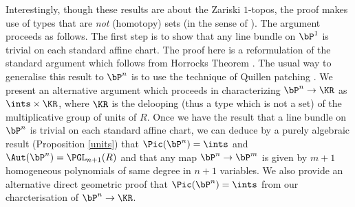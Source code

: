 Interestingly, though these results are
about the Zariski $1$-topos, the proof makes use of types that
are {\em not} (homotopy) sets (in the sense of \cite{hott}).
The argument proceeds as follows. The first step is to show that any line bundle on $\bP^1$
is trivial on each standard affine chart. The proof here is a reformulation of the standard
argument which follows from Horrocks Theorem \cite{Horrocks,Quillen,lombardi-quitte,Lam}.
The usual way to generalise this result to $\bP^n$ is to use the technique
of Quillen patching \cite{Quillen,lombardi-quitte,Lam}. 
We present an alternative argument which proceeds in characterizing $\bP^n\rightarrow\KR$
as $\ints\times\KR$, where $\KR$ is the delooping
(thus a type which is not a set) of the multiplicative group of units of $R$. Once we have
the result that a line bundle on $\bP^n$ is trivial on each standard affine chart, we
can deduce by a purely algebraic result (Proposition \ref{units}) that
$\Pic(\bP^n) = \ints$ and $\Aut(\bP^n) = \PGL_{n+1}(R)$ and that
any map $\bP^n\rightarrow \bP^m$ is given by $m+1$ homogeneous
polynomials of same degree in $n+1$ variables. We also provide an alternative direct geometric
proof that $\Pic(\bP^n) = \ints$ from our charcterisation of $\bP^n\rightarrow \KR$. 















